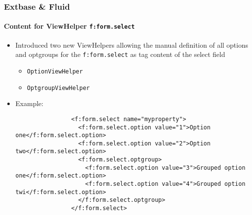 \begin{frame}[fragile]
	\frametitle{Extbase \& Fluid}
	\framesubtitle{Content for ViewHelper \texttt{f:form.select}}

	\lstset{basicstyle=\tiny\ttfamily}

	\begin{itemize}
		\item Introduced two new ViewHelpers allowing the manual definition of all options and
		    optgroups for the \texttt{f:form.select} as tag content of the select field

			\begin{itemize}
				\item \texttt{OptionViewHelper}
				\item \texttt{OptgroupViewHelper}
			\end{itemize}

		\item Example:

			\begin{lstlisting}
				<f:form.select name="myproperty">
				  <f:form.select.option value="1">Option one</f:form.select.option>
				  <f:form.select.option value="2">Option two</f:form.select.option>
				  <f:form.select.optgroup>
				    <f:form.select.option value="3">Grouped option one</f:form.select.option>
				    <f:form.select.option value="4">Grouped option twi</f:form.select.option>
				  </f:form.select.optgroup>
				</f:form.select>
			\end{lstlisting}

		\end{itemize}

\end{frame}

